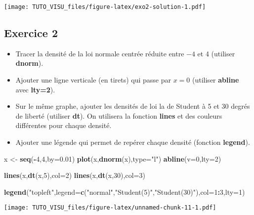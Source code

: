 \documentclass[]{book}
\newenvironment{Shaded}{\begin{snugshade}}{\end{snugshade}}
\newcommand{\DataTypeTok}[1]{\textcolor[rgb]{0.13,0.29,0.53}{#1}}
\newcommand{\DecValTok}[1]{\textcolor[rgb]{0.00,0.00,0.81}{#1}}
\newcommand{\FloatTok}[1]{\textcolor[rgb]{0.00,0.00,0.81}{#1}}
\newcommand{\KeywordTok}[1]{\textcolor[rgb]{0.13,0.29,0.53}{\textbf{#1}}}
\newcommand{\NormalTok}[1]{#1}
\newcommand{\OperatorTok}[1]{\textcolor[rgb]{0.81,0.36,0.00}{\textbf{#1}}}
\newcommand{\StringTok}[1]{\textcolor[rgb]{0.31,0.60,0.02}{#1}}
\providecommand{\tightlist}{%
  \setlength{\itemsep}{0pt}\setlength{\parskip}{0pt}}
\theoremstyle{definition}
\theoremstyle{definition}
\theoremstyle{definition}
\theoremstyle{remark}
\begin{document}
\texttt{[image: TUTO\_VISU\_files/figure-latex/exo2-solution-1.pdf]}

\hypertarget{exercice-2}{%
\subsection{Exercice 2}\label{exercice-2}}

\begin{itemize}
\tightlist
\item
  Tracer la densité de la loi normale centrée réduite entre \(-4\) et 4 (utiliser \textbf{dnorm}).
\item
  Ajouter une ligne verticale (en tirets) qui passe par \(x=0\) (utiliser \textbf{abline} avec \textbf{lty=2}).
\item
  Sur le même graphe, ajouter les densités de loi la de Student à 5 et 30 degrés de liberté (utiliser \textbf{dt}). On utilisera la fonction \textbf{lines} et des couleurs différentes pour chaque densité.
\item
  Ajouter une légende qui permet de repérer chaque densité (fonction \textbf{legend}).
\end{itemize}

\begin{Shaded}
\begin{Highlighting}[]
\NormalTok{x <-}\StringTok{ }\KeywordTok{seq}\NormalTok{(}\OperatorTok{-}\DecValTok{4}\NormalTok{,}\DecValTok{4}\NormalTok{,}\DataTypeTok{by=}\FloatTok{0.01}\NormalTok{)}
\KeywordTok{plot}\NormalTok{(x,}\KeywordTok{dnorm}\NormalTok{(x),}\DataTypeTok{type=}\StringTok{"l"}\NormalTok{)}
\KeywordTok{abline}\NormalTok{(}\DataTypeTok{v=}\DecValTok{0}\NormalTok{,}\DataTypeTok{lty=}\DecValTok{2}\NormalTok{)}

\KeywordTok{lines}\NormalTok{(x,}\KeywordTok{dt}\NormalTok{(x,}\DecValTok{5}\NormalTok{),}\DataTypeTok{col=}\DecValTok{2}\NormalTok{)}
\KeywordTok{lines}\NormalTok{(x,}\KeywordTok{dt}\NormalTok{(x,}\DecValTok{30}\NormalTok{),}\DataTypeTok{col=}\DecValTok{3}\NormalTok{)}

\KeywordTok{legend}\NormalTok{(}\StringTok{"topleft"}\NormalTok{,}\DataTypeTok{legend=}\KeywordTok{c}\NormalTok{(}\StringTok{"normal"}\NormalTok{,}\StringTok{"Student(5)"}\NormalTok{,}\StringTok{"Student(30)"}\NormalTok{),}\DataTypeTok{col=}\DecValTok{1}\OperatorTok{:}\DecValTok{3}\NormalTok{,}\DataTypeTok{lty=}\DecValTok{1}\NormalTok{)}
\end{Highlighting}
\end{Shaded}

\texttt{[image: TUTO\_VISU\_files/figure-latex/unnamed-chunk-11-1.pdf]}
\end{document}
